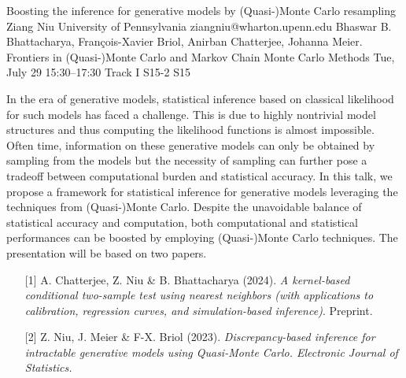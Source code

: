 \begin{talk}
  {Boosting the inference for generative models by (Quasi-)Monte Carlo resampling}%
  {Ziang Niu}%
  {University of Pennsylvania}%
  {ziangniu@wharton.upenn.edu}%
  {Bhaswar B. Bhattacharya, François-Xavier Briol, Anirban Chatterjee, Johanna Meier.}%
  {Frontiers in (Quasi-)Monte Carlo and Markov Chain Monte Carlo Methods}%
  {Tue, July 29 15:30–17:30 Track I}%
  {S15-2}%
  {S15}%
				
			
In the era of generative models, statistical inference based on classical likelihood for such models has faced a challenge. This is due to highly nontrivial model structures and thus computing the likelihood functions is almost impossible. Often time, information on these generative models can only be obtained by sampling from the models but the necessity of sampling can further pose a tradeoff between computational burden and statistical accuracy. In this talk, we propose a framework for statistical inference for generative models leveraging the techniques from (Quasi-)Monte Carlo. Despite the unavoidable balance of statistical accuracy and computation, both computational and statistical performances can be boosted by employing (Quasi-)Monte Carlo techniques. The presentation will be based on two papers.

\begin{enumerate}
	\item[{[1]}] A. Chatterjee, Z. Niu \& B. Bhattacharya (2024). {\it A kernel-based conditional two-sample test using nearest neighbors (with applications to calibration, regression curves, and simulation-based inference)}. Preprint.
	\item[{[2]}] Z. Niu, J. Meier \& F-X. Briol (2023). \it{Discrepancy-based inference for
  intractable generative models using
  Quasi-Monte Carlo.} Electronic Journal of Statistics.
\end{enumerate}

\medskip

\end{talk}

